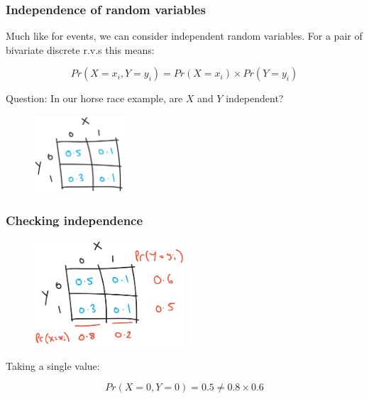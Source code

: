\documentclass{beamer}
\begin{document}
		\begin{frame}
			\frametitle{Independence of random variables}
			
			Much like for events, we can consider independent random variables. For a pair of bivariate discrete r.v.s this means:
			
			\begin{equation}
			Pr(X=x_i, Y=y_i) = Pr(X=x_i) \times Pr(Y=y_i)
			\end{equation}
			
			Question: In our horse race example, are $X$ and $Y$ independent?
			
			\begin{figure}[ht]
				\centerline{\includegraphics[width=0.3\textwidth]{./figures/horse_race_base.pdf}}
			\end{figure}
			
		\end{frame}
		
		\begin{frame}
			\frametitle{Checking independence}
			
			\begin{figure}[ht]
				\centerline{\includegraphics[width=0.5\textwidth]{./figures/horse_race_checking_independence.pdf}}
			\end{figure}
			
			Taking a single value:
			
			\begin{equation}
			Pr(X=0, Y=0) = 0.5 \neq 0.8 \times 0.6
			\end{equation}
			
		\end{frame}
	
\end{document}
